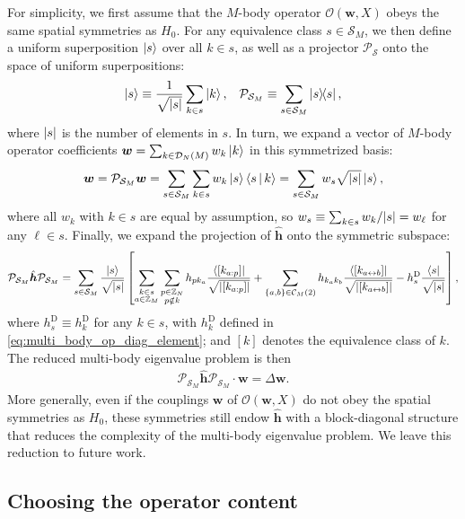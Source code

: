 \documentclass[nofootinbib,notitlepage,11pt]{revtex4-2}
\renewcommand{\t}{\text} %
\newcommand{\f}[2]{\dfrac{#1}{#2}} %
\newcommand{\p}[1]{\left(#1\right)} %
\renewcommand{\sp}[1]{\left[#1\right]} %
\renewcommand{\set}[1]{\left\{#1\right\}} %
\newcommand{\bk}{\Braket} %
\renewcommand{\c}{\cdot} %
\newcommand{\m}{\bm} %
\newcommand{\1}{\mathds{1}}
\newcommand{\C}{\mathcal{C}}
\newcommand{\D}{\mathcal{D}}
\renewcommand{\O}{\mathcal{O}}
\renewcommand{\P}{\mathcal{P}}
\renewcommand{\S}{\mathcal{S}}
\newcommand{\ZZ}{\mathbb{Z}}
\newcommand{\lra}{\leftrightarrow}
\begin{document}
For simplicity, we first assume that the $M$-body operator $\O\p{\m w,X}$ obeys the same spatial symmetries as $H_0$.
For any equivalence class $s\in\S_M$, we then define a uniform superposition $\ket{s}$ over all $k\in s$, as well as a projector $\P_\S$ onto the space of uniform superpositions:
\begin{align}
  \ket{s} \equiv \f1{\sqrt{\abs{s}}} \sum_{k\in s} \ket{k},
  &&
  \P_{\S_M} \equiv \sum_{s\in\S_M} \op{s},
\end{align}
where $\abs{s}$ is the number of elements in $s$.
In turn, we expand a vector of $M$-body operator coefficients $\m w=\sum_{k\in\D_N\p{M}}w_k\ket{k}$ in this symmetrized basis:
\begin{align}
  \m w = \P_{\S_M} \m w
  = \sum_{s\in\S_M} \sum_{k\in s} w_k \ket{s} \bk{s|k}
  = \sum_{s\in\S_M} w_s \sqrt{\abs{s}} \ket{s},
\end{align}
where all $w_k$ with $k\in s$ are equal by assumption, so $w_s\equiv\sum_{k\in s}w_k/\abs{s}=w_\ell$ for any $\ell\in s$.
Finally, we expand the projection of $\hat{\m h}$ onto the symmetric subspace:
\begin{align}
  \P_{\S_M} \hat{\m h} \P_{\S_M}
  = \sum_{s\in\S_M} \f{\ket{s}}{\sqrt{\abs{s}}} \sp{
    \sum_{\substack{k\in s\\a\in\ZZ_M}}
    \sum_{\substack{p\in\ZZ_N\\p\notin k}}
    h_{p k_a} \f{\bra{\sp{k_{a:p}}}}{\sqrt{\abs{\sp{k_{a:p}}}}}
    + \sum_{\set{a,b}\in\C_M\p{2}} h_{k_ak_b}
    \f{\bra{\sp{k_{a\lra b}}}}{\sqrt{\abs{\sp{k_{a\lra b}}}}}
    - h^{\t{D}}_s \f{\bra{s}}{\sqrt{\abs{s}}}},
\end{align}
where $h^{\t{D}}_s\equiv h^{\t{D}}_k$ for any $k\in s$, with $h^{\t{D}}_k$ defined in \eqref{eq:multi_body_op_diag_element}; and $\sp{k}$ denotes the equivalence class of $k$.
The reduced multi-body eigenvalue problem is then
\begin{align}
  \P_{\S_M} \hat{\m h} \P_{\S_M} \c \m w = \Delta \m w.
\end{align}
More generally, even if the couplings $\m w$ of $\O\p{\m w,X}$ do not obey the spatial symmetries as $H_0$, these symmetries still endow $\hat{\m h}$ with a block-diagonal structure that reduces the complexity of the multi-body eigenvalue problem.
We leave this reduction to future work.

\subsection{Choosing the operator content}
\label{sec:operator_content}
\end{document}
